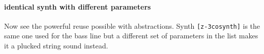 \paragraph{identical synth with different parameters}
Now see the powerful reuse possible with abstractions.
Synth \verb+[z-3cosynth]+ is the same one used for the bass
line but a different set of parameters in the list makes it 
a plucked string sound instead.